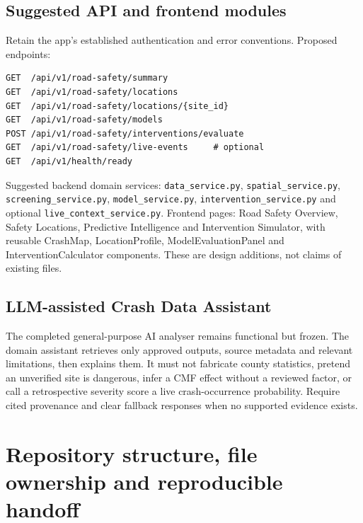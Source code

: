 \documentclass[11pt,a4paper,openany]{report}
\newcommand{\pathcode}[1]{\nolinkurl{#1}}
\begin{document}
\section{Suggested API and frontend modules}
Retain the app's established authentication and error conventions. Proposed endpoints:
\begin{lstlisting}
GET  /api/v1/road-safety/summary
GET  /api/v1/road-safety/locations
GET  /api/v1/road-safety/locations/{site_id}
GET  /api/v1/road-safety/models
POST /api/v1/road-safety/interventions/evaluate
GET  /api/v1/road-safety/live-events     # optional
GET  /api/v1/health/ready
\end{lstlisting}
Suggested backend domain services: \pathcode{data_service.py}, \pathcode{spatial_service.py}, \pathcode{screening_service.py}, \pathcode{model_service.py}, \pathcode{intervention_service.py} and optional \pathcode{live_context_service.py}. Frontend pages: Road Safety Overview, Safety Locations, Predictive Intelligence and Intervention Simulator, with reusable CrashMap, LocationProfile, ModelEvaluationPanel and InterventionCalculator components. These are design additions, not claims of existing files.

\section{LLM-assisted Crash Data Assistant}
The completed general-purpose AI analyser remains functional but frozen. The domain assistant retrieves only approved outputs, source metadata and relevant limitations, then explains them. It must not fabricate county statistics, pretend an unverified site is dangerous, infer a CMF effect without a reviewed factor, or call a retrospective severity score a live crash-occurrence probability. Require cited provenance and clear fallback responses when no supported evidence exists.

\chapter{Repository structure, file ownership and reproducible handoff}
\end{document}
